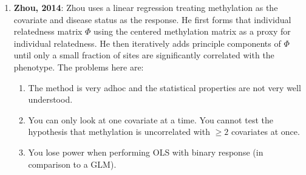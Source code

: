 \documentclass{article}
\begin{document}
\begin{enumerate}
		\item \textbf{Zhou, 2014}: Zhou uses a linear regression treating methylation as the covariate and disease status as the response. He first forms that individual relatedness matrix $\Phi$ using the centered methylation matrix as a proxy for individual relatedness. He then iteratively adds principle components of $\Phi$ until only a small fraction of sites are significantly correlated with the phenotype. The problems here are:
			\begin{enumerate}
			\item The method is very adhoc and the statistical properties are not very well understood.
			\item You can only look at one covariate at a time. You cannot test the hypothesis that methylation is uncorrelated with $\geq 2$ covariates at once.
			\item You lose power when performing OLS with binary response (in comparison to a GLM).
			\end{enumerate}
	\end{enumerate}
\end{document}
